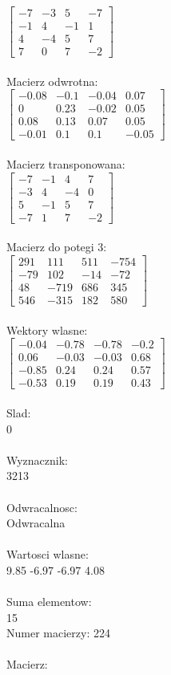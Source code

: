 \documentclass[a4paper,12pt]{article}
\begin{document}
$\begin{bmatrix} -7&-3&5&-7\\-1&4&-1&1\\4&-4&5&7\\7&0&7&-2 \end{bmatrix}$
\\
\\
Macierz odwrotna:\\

$\begin{bmatrix} -0.08&-0.1&-0.04&0.07\\0&0.23&-0.02&0.05\\0.08&0.13&0.07&0.05\\-0.01&0.1&0.1&-0.05 \end{bmatrix}$
\\
\\
Macierz transponowana:\\

$\begin{bmatrix} -7&-1&4&7\\-3&4&-4&0\\5&-1&5&7\\-7&1&7&-2 \end{bmatrix}$
\\
\\
Macierz do potegi 3:\\

$\begin{bmatrix} 291&111&511&-754\\-79&102&-14&-72\\48&-719&686&345\\546&-315&182&580 \end{bmatrix}$
\\
\\
Wektory wlasne:\\

$\begin{bmatrix} -0.04&-0.78&-0.78&-0.2\\0.06&-0.03&-0.03&0.68\\-0.85&0.24&0.24&0.57\\-0.53&0.19&0.19&0.43 \end{bmatrix}$
\\
\\
Slad:\\
0
\\
\\
Wyznacznik:\\
3213
\\
\\
Odwracalnosc:\\
Odwracalna
\\
\\
Wartosci wlasne:\\
9.85 -6.97 -6.97 4.08
\\
\\
Suma elementow:\\
15
\\
\newpage
Numer macierzy:
224
\\
\\
Macierz:\\
\end{document}
